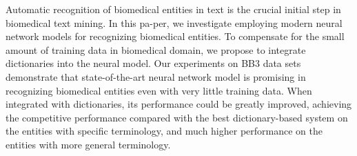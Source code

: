 Automatic recognition of biomedical entities in text is the crucial initial step in biomedical text mining. In this pa-per, we investigate employing modern neural network models for recognizing biomedical entities. To compensate for the small amount of training data in biomedical domain, we propose to integrate dictionaries into the neural model. Our experiments on BB3 data sets demonstrate that state-of-the-art neural network model is promising in recognizing biomedical entities even with very little training data. When integrated with dictionaries, its performance could be greatly improved, achieving the competitive performance compared with the best dictionary-based system on the entities with specific terminology, and much higher performance on the entities with more general terminology.
